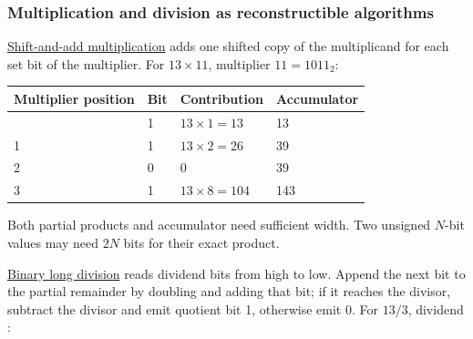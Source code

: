 \subsubsection{Multiplication and division as reconstructible algorithms}\label{01-foundations-i-ch001-multiplication-and-division-as-reconstructible-algorithms}

\hypertarget{01-foundations-i-ch001-multiplication-and-division-as-reconstructible-algorithms}{}

\hyperref[appendix-a65290d66ed9]{Shift-and-add multiplication} adds one shifted copy of the multiplicand for each set bit of the multiplier. For \(13\times11\), multiplier \(11=1011_2\):

{\def\LTcaptype{none} %
\begin{longtable}[]{@{}llll@{}}
\toprule\noalign{}
Multiplier position & Bit & Contribution & Accumulator \\
\midrule\noalign{}
\endhead
\bottomrule\noalign{}
\endlastfoot
0 & 1 & \(13\times1=13\) & 13 \\
1 & 1 & \(13\times2=26\) & 39 \\
2 & 0 & 0 & 39 \\
3 & 1 & \(13\times8=104\) & 143 \\
\end{longtable}
}

Both partial products and accumulator need sufficient width. Two unsigned \(N\)-bit values may need \(2N\) bits for their exact product.

\hyperref[appendix-89985e6a2685]{Binary long division} reads dividend bits from high to low. Append the next bit to the partial remainder by doubling and adding that bit; if it reaches the divisor, subtract the divisor and emit quotient bit 1, otherwise emit 0. For \(13/3\), dividend :

